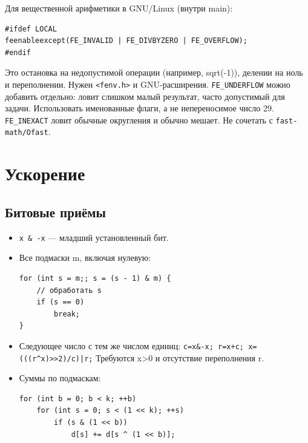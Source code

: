 Для вещественной арифметики в GNU/Linux (внутри main):
\begin{lstlisting}
#ifdef LOCAL
feenableexcept(FE_INVALID | FE_DIVBYZERO | FE_OVERFLOW);
#endif
\end{lstlisting}
Это остановка на недопустимой операции (например, sqrt(-1)), делении
на ноль и переполнении. Нужен \texttt{<fenv.h>} и GNU-расширения.
\texttt{FE\_UNDERFLOW} можно добавить отдельно: ловит слишком малый
результат, часто допустимый для задачи. Использовать именованные флаги,
а не непереносимое число 29. \texttt{FE\_INEXACT} ловит обычные
округления и обычно мешает. Не сочетать с \texttt{fast-math/Ofast}.

\section{Ускорение}
\subsection{Битовые приёмы}
\begin{itemize}[nosep,leftmargin=*]
\item \texttt{x \& -x} — младший установленный бит.
\item Все подмаски m, включая нулевую:
\begin{lstlisting}
for (int s = m;; s = (s - 1) & m) {
    // обработать s
    if (s == 0)
        break;
}
\end{lstlisting}
\item Следующее число с тем же числом единиц:
\texttt{c=x\&-x; r=x+c; x=(((r\^{}x)>>2)/c)|r;}
Требуются x>0 и отсутствие переполнения r.
\item Суммы по подмаскам:
\begin{lstlisting}
for (int b = 0; b < k; ++b)
    for (int s = 0; s < (1 << k); ++s)
        if (s & (1 << b))
            d[s] += d[s ^ (1 << b)];
\end{lstlisting}
\end{itemize}
	
